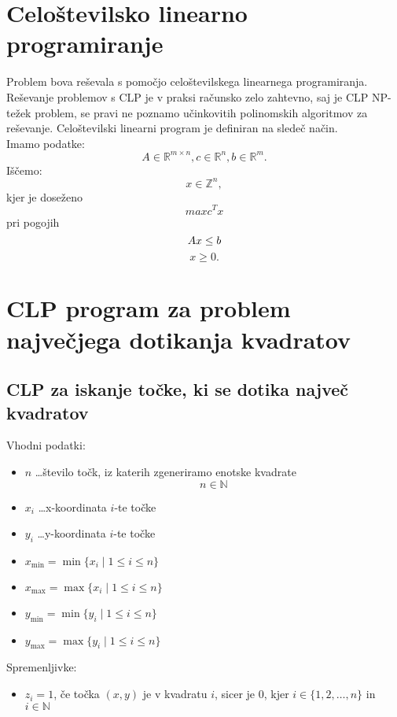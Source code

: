 \documentclass[a4paper]{article}
\begin{document}
\newpage{}

\section{Celoštevilsko linearno programiranje}

Problem bova reševala s pomočjo celoštevilskega linearnega programiranja. Reševanje problemov s CLP je v praksi računsko zelo zahtevno, saj je CLP NP-težek problem, se pravi ne poznamo učinkovitih polinomskih algoritmov za reševanje. Celoštevilski linearni program je definiran na sledeč način. \\
Imamo podatke:
$$A \in \mathbb{R}^{m \times n}, c \in  \mathbb{R}^{n}, b \in  \mathbb{R}^{m }. $$ Iščemo: $$x \in  \mathbb{Z}^{n},$$kjer je doseženo$$maxc^Tx$$
pri pogojih $$Ax\le b\\$$ $$x \ge 0.$$

\section{CLP program za problem največjega dotikanja kvadratov}

\subsection{CLP za iskanje točke, ki se dotika največ kvadratov}

Vhodni podatki:

\begin{itemize}
\item{$n$ \dots število točk, iz katerih zgeneriramo enotske kvadrate} $$n \in \mathbb{N}$$
\item{$x_{i}$ \dots x-koordinata $i$-te točke}
\item{$y_{i}$ \dots y-koordinata $i$-te točke}
\item{$x_{\min} = \min \{x_i \mid 1 \le i \le n\}$}
\item{$x_{\max} = \max \{x_i \mid 1 \le i \le n\}$}
\item{$y_{\min} = \min \{y_i \mid 1 \le i \le n\}$}
\item{$y_{\max} = \max \{y_i \mid 1 \le i \le n\}$}
\end{itemize}

Spremenljivke:

\begin{itemize}
\item{$z_{i}= 1$, če točka $(x,y)$ je v kvadratu $i$}, sicer je $0$, kjer $i \in \{1, 2, \dots, n\}$ in $i \in \mathbb{N}$
\end{itemize}
\end{document}
